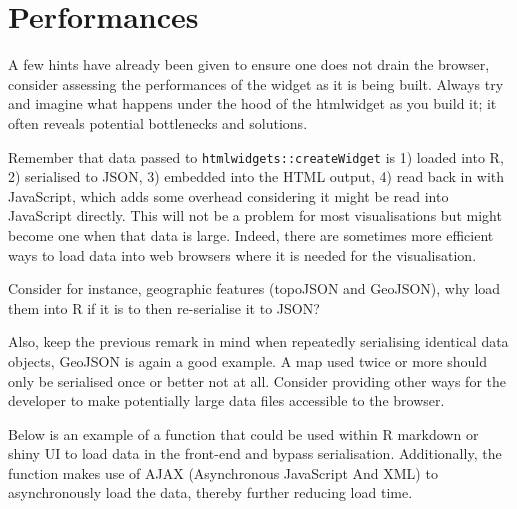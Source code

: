 \documentclass[
]{krantz}
\makeatletter
\newenvironment{Shaded}{\begin{snugshade}}{\end{snugshade}}
\newcommand{\CommentTok}[1]{\textcolor[rgb]{0.37,0.37,0.37}{\textit{#1}}}
\newcommand{\ControlFlowTok}[1]{\textcolor[rgb]{0.27,0.27,0.27}{\textbf{#1}}}
\newcommand{\KeywordTok}[1]{\textcolor[rgb]{0.27,0.27,0.27}{\textbf{#1}}}
\newcommand{\NormalTok}[1]{#1}
\newcommand{\OperatorTok}[1]{\textcolor[rgb]{0.43,0.43,0.43}{\textbf{#1}}}
\newcommand{\StringTok}[1]{\textcolor[rgb]{0.5,0.5,0.5}{#1}}
\newenvironment{kframe}{%
\medskip{}
\setlength{\fboxsep}{.8em}
 \def\at@end@of@kframe{}%
 \ifinner\ifhmode%
  \def\at@end@of@kframe{\end{minipage}}%
  \begin{minipage}{\columnwidth}%
 \fi\fi%
 \def\FrameCommand##1{\hskip\@totalleftmargin \hskip-\fboxsep
 \colorbox{shadecolor}{##1}\hskip-\fboxsep
     \hskip-\linewidth \hskip-\@totalleftmargin \hskip\columnwidth}%
 \MakeFramed {\advance\hsize-\width
   \@totalleftmargin\z@ \linewidth\hsize
   \@setminipage}}%
 {\par\unskip\endMakeFramed%
 \at@end@of@kframe}
\renewenvironment{Shaded}{\begin{kframe}}{\end{kframe}}
\makeatother
\begin{document}
\hypertarget{widgets-adv-performances}{%
\section{Performances}\label{widgets-adv-performances}}

A few hints have already been given to ensure one does not drain the browser, consider assessing the performances of the widget as it is being built. Always try and imagine what happens under the hood of the htmlwidget as you build it; it often reveals potential bottlenecks and solutions.

Remember that data passed to \texttt{htmlwidgets::createWidget} is 1) loaded into R, 2) serialised to JSON, 3) embedded into the HTML output, 4) read back in with JavaScript, which adds some overhead considering it might be read into JavaScript directly. This will not be a problem for most visualisations but might become one when that data is large. Indeed, there are sometimes more efficient ways to load data into web browsers where it is needed for the visualisation.

Consider for instance, geographic features (topoJSON and GeoJSON), why load them into R if it is to then re-serialise it to JSON?

Also, keep the previous remark in mind when repeatedly serialising identical data objects, GeoJSON is again a good example. A map used twice or more should only be serialised once or better not at all. Consider providing other ways for the developer to make potentially large data files accessible to the browser.

Below is an example of a function that could be used within R markdown or shiny UI to load data in the front-end and bypass serialisation. Additionally, the function makes use of AJAX (Asynchronous JavaScript And XML) to asynchronously load the data, thereby further reducing load time.

\begin{Shaded}
\end{Shaded}
\end{document}
